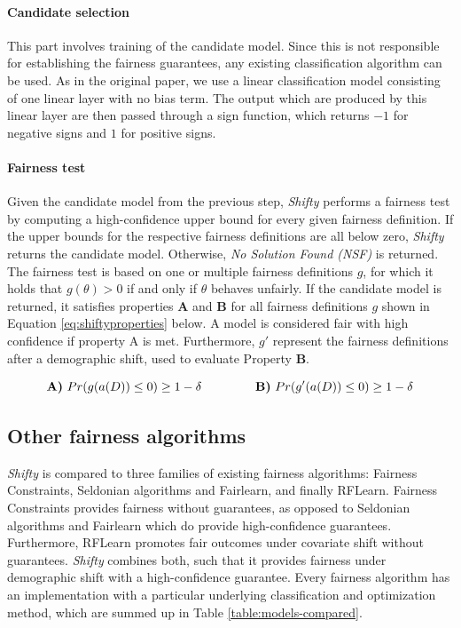 
\paragraph{Candidate selection} This part involves training of the candidate model. Since this is not responsible for establishing the fairness guarantees, any existing classification algorithm can be used. As in the original paper, we use a linear classification model consisting of one linear layer with no bias term. The output which are produced by this linear layer are then passed through a sign function, which returns $-1$ for negative signs and $1$ for positive signs.

\paragraph{Fairness test} Given the candidate model from the previous step, \textit{Shifty} performs a fairness test by computing a high-confidence upper bound for every given fairness definition. If the upper bounds for the respective fairness definitions are all below zero, \textit{Shifty} returns the candidate model. Otherwise, \textit{No Solution Found (NSF)} is returned. The fairness test is based on one or multiple fairness definitions $g$, for which it holds that $g(\theta) > 0$ if and only if $\theta$ behaves unfairly.
If the candidate model is returned, it satisfies properties \textbf{A} and \textbf{B} for all fairness definitions $g$ shown in Equation \ref{eq:shiftyproperties} below. A model is considered fair with high confidence if property A is met.  Furthermore, $g'$ represent the fairness definitions after a demographic shift, used to evaluate Property \textbf{B}.

\begin{equation} \label{eq:shiftyproperties}
\text{\textbf{A)} } Pr(g(a(D)) \leq 0) \geq 1 - \delta \qquad \qquad \text{ \textbf{B)} } Pr(g'(a(D)) \leq 0) \geq 1 - \delta
\end{equation}
    
\subsection{Other fairness algorithms}
\textit{Shifty} is compared to three families of existing fairness algorithms: Fairness Constraints, Seldonian algorithms and Fairlearn, and finally RFLearn. Fairness Constraints provides fairness without guarantees, as opposed to Seldonian algorithms and Fairlearn which do provide high-confidence guarantees. Furthermore, RFLearn promotes fair outcomes under covariate shift without guarantees. \textit{Shifty} combines both, such that it provides fairness under demographic shift with a high-confidence guarantee. Every fairness algorithm has an implementation with a particular underlying classification and optimization method, which are summed up in Table \ref{table:models-compared}.

